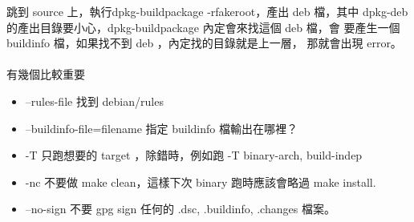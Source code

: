   跳到 source 上，執行dpkg-buildpackage -rfakeroot，產出 deb 檔，其中
  dpkg-deb 的產出目錄要小心，dpkg-buildpackage 內定會來找這個 deb 檔，會
  要產生一個 buildinfo 檔，如果找不到 deb ，內定找的目錄就是上一層，
  那就會出現 error。
  \\\\
  有幾個比較重要
  \begin{itemize}
    \item --rules-file 找到 debian/rules
    \item --buildinfo-file=filename 指定 buildinfo 檔輸出在哪裡？
    \item -T 只跑想要的 target ，除錯時，例如跑 -T binary-arch, build-indep
    \item -nc 不要做 make clean，這樣下次 binary 跑時應該會略過 make install.
    \item --no-sign 不要 gpg sign 任何的 .dsc, .buildinfo, .changes 檔案。
  \end{itemize}

